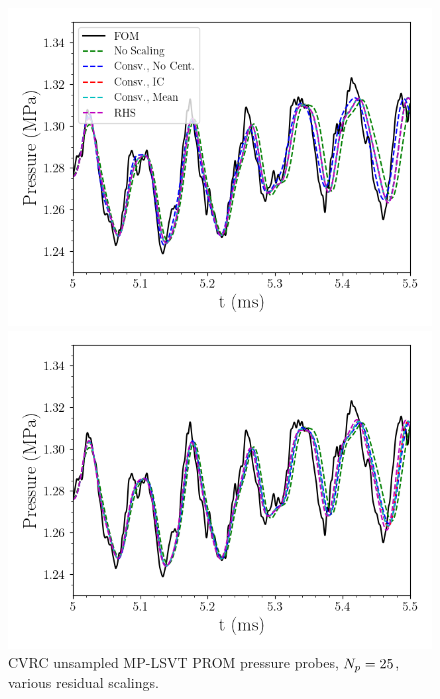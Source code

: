 \begin{figure}
	\begin{minipage}{0.49\linewidth}
		\includegraphics[width=0.99\linewidth]{Chapters/BestPractices/Images/pressure_probe_scale_l2.png}
	\end{minipage}
	\begin{minipage}{0.49\linewidth}
		\includegraphics[width=0.99\linewidth]{Chapters/BestPractices/Images/pressure_probe_scale_minmax.png}
	\end{minipage}
	\caption{CVRC unsampled MP-LSVT PROM pressure probes, $N_p = 25$, various residual scalings.}
\end{figure}